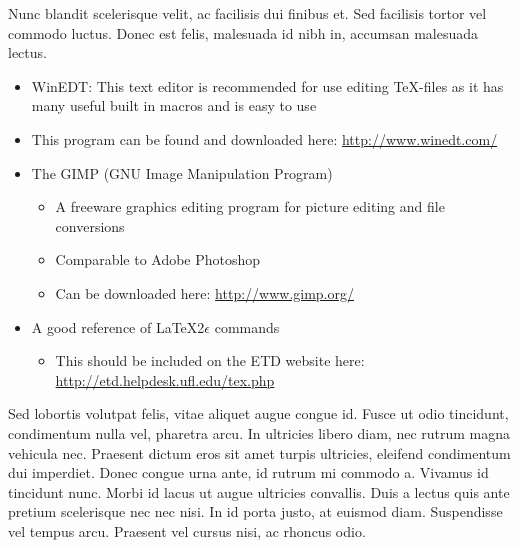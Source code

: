 Nunc blandit scelerisque velit, ac facilisis dui finibus et. Sed facilisis tortor vel commodo luctus. Donec est felis, malesuada id nibh in, accumsan malesuada lectus.
\begin{itemize} %
    \item WinEDT: This text editor is recommended for use editing \TeX-files as it has many useful built in macros and is easy to use  %
    \item This program can be found and downloaded here: \url{http://www.winedt.com/} %
    \item The GIMP (GNU Image Manipulation Program) %
    \begin{itemize}%
        \item A freeware graphics editing program for picture editing and file conversions %
        \item Comparable to Adobe Photoshop %
        \item Can be downloaded here: \url{http://www.gimp.org/}%
    \end{itemize}
    \item A good reference of \LaTeX 2\ensuremath{\epsilon} commands%
    \begin{itemize}
        \item This should be included on the ETD website here: \url{http://etd.helpdesk.ufl.edu/tex.php}
    \end{itemize}
\end{itemize} %


Sed lobortis volutpat felis, vitae aliquet augue congue id. Fusce ut odio tincidunt, condimentum nulla vel, pharetra arcu. In ultricies libero diam, nec rutrum magna vehicula nec. Praesent dictum eros sit amet turpis ultricies, eleifend condimentum dui imperdiet. Donec congue urna ante, id rutrum mi commodo a. Vivamus id tincidunt nunc. Morbi id lacus ut augue ultricies convallis. Duis a lectus quis ante pretium scelerisque nec nec nisi. In id porta justo, at euismod diam. Suspendisse vel tempus arcu. Praesent vel cursus nisi, ac rhoncus odio.
